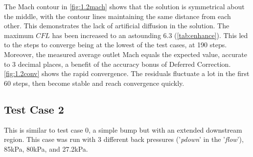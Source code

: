 \documentclass[12pt, a4paper]{article}
\begin{document}
The Mach contour in \autoref{fig:1.2mach} shows that the solution is symmetrical about the middle, with the contour lines maintaining the same distance from each other. This demonstrates the lack of artificial diffusion in the solution. The maximum $CFL$ has been increased to an astounding 6.3 (\autoref{tab:enhance}). This led to the steps to converge being at the lowest of the test cases, at 190 steps. Moreover, the measured average outlet Mach equals the expected value, accurate to 3 decimal places, a benefit of the accuracy bonus of Deferred Correction. \autoref{fig:1.2conv} shows the rapid convergence. The residuals fluctuate a lot in the first 60 steps, then become stable and reach convergence quickly.
 
\subsection{Test Case 2}
This is similar to test case 0, a simple bump but with an extended downstream region. This case was run with 3 different back pressures ('\textit{pdown}' in the '\textit{flow}'), 85kPa, 80kPa, and 27.2kPa. 
\end{document}
